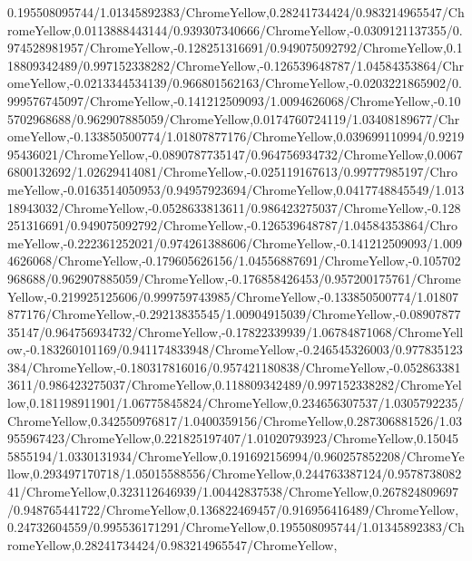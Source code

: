 {\begin{tikzternal}
{0.195508095744/1.01345892383/ChromeYellow,0.28241734424/0.983214965547/ChromeYellow,0.0113888443144/0.939307340666/ChromeYellow,-0.0309121137355/0.974528981957/ChromeYellow,-0.128251316691/0.949075092792/ChromeYellow,0.118809342489/0.997152338282/ChromeYellow,-0.126539648787/1.04584353864/ChromeYellow,-0.0213344534139/0.966801562163/ChromeYellow,-0.0203221865902/0.999576745097/ChromeYellow,-0.141212509093/1.0094626068/ChromeYellow,-0.105702968688/0.962907885059/ChromeYellow,0.0174760724119/1.03408189677/ChromeYellow,-0.133850500774/1.01807877176/ChromeYellow,0.039699110994/0.921995436021/ChromeYellow,-0.0890787735147/0.964756934732/ChromeYellow,0.00676800132692/1.02629414081/ChromeYellow,-0.025119167613/0.99777985197/ChromeYellow,-0.0163514050953/0.94957923694/ChromeYellow,0.0417748845549/1.01318943032/ChromeYellow,-0.0528633813611/0.986423275037/ChromeYellow,-0.128251316691/0.949075092792/ChromeYellow,-0.126539648787/1.04584353864/ChromeYellow,-0.222361252021/0.974261388606/ChromeYellow,-0.141212509093/1.0094626068/ChromeYellow,-0.179605626156/1.04556887691/ChromeYellow,-0.105702968688/0.962907885059/ChromeYellow,-0.176858426453/0.957200175761/ChromeYellow,-0.219925125606/0.999759743985/ChromeYellow,-0.133850500774/1.01807877176/ChromeYellow,-0.29213835545/1.00904915039/ChromeYellow,-0.0890787735147/0.964756934732/ChromeYellow,-0.17822339939/1.06784871068/ChromeYellow,-0.183260101169/0.941174833948/ChromeYellow,-0.246545326003/0.977835123384/ChromeYellow,-0.180317816016/0.957421180838/ChromeYellow,-0.0528633813611/0.986423275037/ChromeYellow,0.118809342489/0.997152338282/ChromeYellow,0.181198911901/1.06775845824/ChromeYellow,0.234656307537/1.0305792235/ChromeYellow,0.342550976817/1.0400359156/ChromeYellow,0.287306881526/1.03955967423/ChromeYellow,0.221825197407/1.01020793923/ChromeYellow,0.150455855194/1.0330131934/ChromeYellow,0.191692156994/0.960257852208/ChromeYellow,0.293497170718/1.05015588556/ChromeYellow,0.244763387124/0.957873808241/ChromeYellow,0.323112646939/1.00442837538/ChromeYellow,0.267824809697/0.948765441722/ChromeYellow,0.136822469457/0.916956416489/ChromeYellow,0.24732604559/0.995536171291/ChromeYellow,0.195508095744/1.01345892383/ChromeYellow,0.28241734424/0.983214965547/ChromeYellow,
}
\end{tikzternal}}
